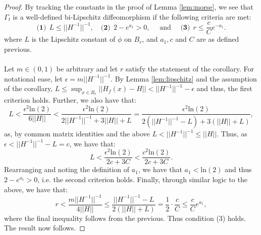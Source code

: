 \documentclass[10pt,a4paper]{amsart}
\begin{document}
\begin{proof}
    By tracking the constants in the proof of Lemma \ref{lem:morse}, we see that $\Gamma_t$ is a well-defined bi-Lipschitz diffeomorphism if the following criteria are met:
    \begin{equation}\nonumber
       \textbf{(1)}~~ L \leq ||H^{-1}||^{-1}, \quad \textbf{(2)}~~ 2-e^{a_1} > 0, \quad \text{ and } \quad \textbf{(3)}~~ r \leq \frac{c}{C}e^{-a_1}.
    \end{equation}
    where $L$ is the Lipschitz constant of $\phi$ on $B_r$, and $a_1, c$ and $C$ are as defined previous.\\
    \\
    Let $m\in(0,1)$ be arbitrary and let $r$ satisfy the statement of the corollary. For notational ease, let $\epsilon=m||H^{-1}||^{-1}$. By Lemma \ref{lem:lipschitz} and the assumption of the corollary, $L\leq\sup_{x\in B_r}||H_f(x)-H||<||H^{-1}||^{-1}-\epsilon$ and thus, the first criterion holds. Further, we also have that:
    \begin{equation}\nonumber
        L < \frac{\epsilon^2\text{ln}(2)}{6||H||} < \frac{\epsilon^2\text{ln}(2)}{2||H^{-1}||^{-1} + 3||H|| + L} = \frac{\epsilon^2\text{ln}(2)}{2(||H^{-1}||^{-1}-L) + 3(||H|| + L)},
    \end{equation}
    as, by common matrix identities and the above $L<||H^{-1}||^{-1}\leq||H||$. Thus, as $\epsilon < ||H^{-1}||^{-1}-L=c$, we have that:
    \begin{equation}\nonumber
        L < \frac{\epsilon^2\text{ln}(2)}{2c + 3C} < \frac{c^2\text{ln}(2)}{2c + 3C}.
    \end{equation}
    Rearranging and noting the definition of $a_1$, we have that $a_1<\text{ln}(2)$ and thus $2-e^{a_1}>0$, i.e. the second criterion holds.  Finally, through similar logic to the above, we have that:
    \begin{equation}\nonumber
        r < \frac{m||H^{-1}||^{-1}}{4||H||} \leq \frac{||H^{-1}||^{-1}-L}{2(||H||+L)} = \frac{1}{2}\cdot\frac{c}{C} \leq \frac{c}{C} e^{a_1},
    \end{equation}
    where the final inequality follows from the previous. Thus condition (3) holds. The result now follows.
\end{proof}
\end{document}
